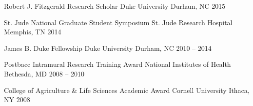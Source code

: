 

\begin{cvhonors}

  \cvhonor
    {Robert J. Fitzgerald Research Scholar} %
    {Duke University} %
    {Durham, NC} %
    {2015} %


  \cvhonor
    {St. Jude National Graduate Student Symposium} %
    {St. Jude Research Hospital} %
    {Memphis, TN} %
    {2014} %


  \cvhonor
    {James B. Duke Fellowship} %
    {Duke University} %
    {Durham, NC} %
    {2010 -- 2014} %


  \cvhonor
    {Postbacc Intramural Research Training Award} %
    {National Institutes of Health} %
    {Bethesda, MD} %
    {2008 -- 2010} %

  \cvhonor
    {College of Agriculture \& Life Sciences Academic Award}
    {Cornell University} %
    {Ithaca, NY} %
    {2008} %


\end{cvhonors}
